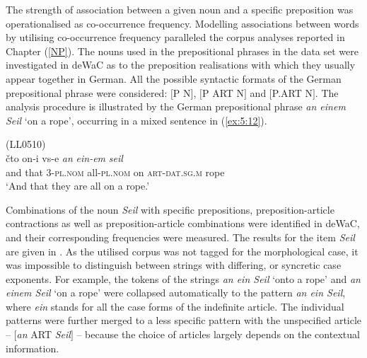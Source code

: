 \noindent The strength of association between a given noun and a specific preposition was operationalised as co-occurrence frequency.  Modelling associations between words by utilising co-occurrence frequency paralleled the corpus analyses reported in Chapter (\ref{NP}). The nouns used in the prepositional phrases in the data set were investigated in deWaC as to the preposition realisations with which they usually appear together in German. All the possible syntactic formats of the German prepositional phrase were considered: \([\)P N\(]\), \([\)P ART N\(]\) and \([\)P.ART N\(]\). The analysis procedure is illustrated by the German prepositional phrase \textit{an einem Seil} `on a rope', occurring in a mixed sentence in (\ref{ex:5:12}).

\ea
\label{ex:5:12}
(LL0510)\\
 {čto} {on-i} {vs-e} \textit{an} \textit{ein-em} \textit{seil}\\
	{and} that 3-\textsc{pl.nom} all-\textsc{pl.nom} on \textsc{art-dat.sg.m} rope\\
\glt `And that they are all on a rope.'
\z

\noindent Combinations of the noun \textit{Seil} with specific prepositions, preposition-article contractions as well as preposition-article combinations were identified in deWaC, and their corresponding frequencies were measured. The results for the item \textit{Seil} are given in . As the utilised corpus was not tagged for the morphological case, it was impossible to distinguish between strings with differing, or syncretic case exponents. For example, the tokens of the strings \textit{an ein Seil} `onto a rope' and \textit{an einem Seil} `on a rope' were collapsed automatically to the pattern \textit{an ein Seil}, where \textit{ein} stands for all the case forms of the indefinite article. The individual patterns were further merged to a less specific pattern with the unspecified article -- \([\)\textit{an} ART \textit{Seil}\(]\) -- because the choice of articles largely depends on the contextual information.


